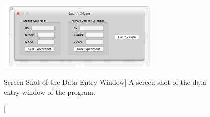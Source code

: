 \documentclass[12pt]{article} %
\begin{document}
\begin{figure}[h]
	\centering
	\includegraphics[width=0.7\textwidth]{dataEntry.png}
	\caption
	[Screen Shot of the Data Entry Window]
	{A screen shot of the data entry window of the program.  }
	\label{fig:dataEntry}
\end{figure}





\nocite{*} 	%



\end{document}
